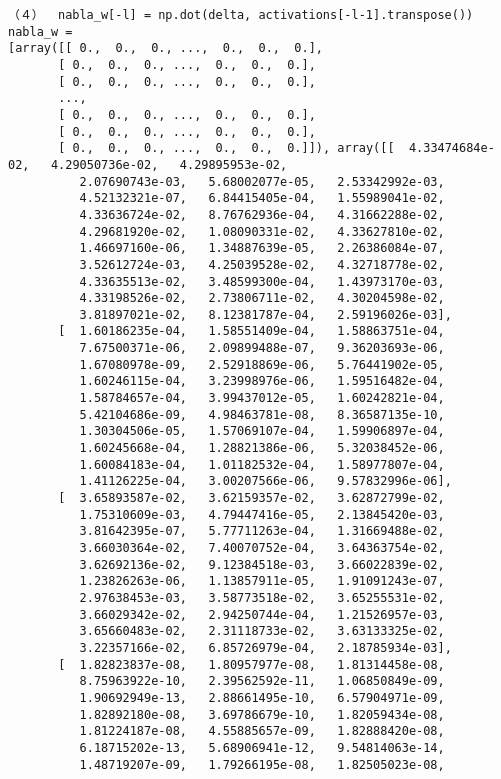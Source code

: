 \documentclass[11pt,a4j,fleqn]{jarticle}
\begin{document}
\begin{verbatim}
（４）  nabla_w[-l] = np.dot(delta, activations[-l-1].transpose())
nabla_w =
[array([[ 0.,  0.,  0., ...,  0.,  0.,  0.],
       [ 0.,  0.,  0., ...,  0.,  0.,  0.],
       [ 0.,  0.,  0., ...,  0.,  0.,  0.],
       ..., 
       [ 0.,  0.,  0., ...,  0.,  0.,  0.],
       [ 0.,  0.,  0., ...,  0.,  0.,  0.],
       [ 0.,  0.,  0., ...,  0.,  0.,  0.]]), array([[  4.33474684e-02,   4.29050736e-02,   4.29895953e-02,
          2.07690743e-03,   5.68002077e-05,   2.53342992e-03,
          4.52132321e-07,   6.84415405e-04,   1.55989041e-02,
          4.33636724e-02,   8.76762936e-04,   4.31662288e-02,
          4.29681920e-02,   1.08090331e-02,   4.33627810e-02,
          1.46697160e-06,   1.34887639e-05,   2.26386084e-07,
          3.52612724e-03,   4.25039528e-02,   4.32718778e-02,
          4.33635513e-02,   3.48599300e-04,   1.43973170e-03,
          4.33198526e-02,   2.73806711e-02,   4.30204598e-02,
          3.81897021e-02,   8.12381787e-04,   2.59196026e-03],
       [  1.60186235e-04,   1.58551409e-04,   1.58863751e-04,
          7.67500371e-06,   2.09899488e-07,   9.36203693e-06,
          1.67080978e-09,   2.52918869e-06,   5.76441902e-05,
          1.60246115e-04,   3.23998976e-06,   1.59516482e-04,
          1.58784657e-04,   3.99437012e-05,   1.60242821e-04,
          5.42104686e-09,   4.98463781e-08,   8.36587135e-10,
          1.30304506e-05,   1.57069107e-04,   1.59906897e-04,
          1.60245668e-04,   1.28821386e-06,   5.32038452e-06,
          1.60084183e-04,   1.01182532e-04,   1.58977807e-04,
          1.41126225e-04,   3.00207566e-06,   9.57832996e-06],
       [  3.65893587e-02,   3.62159357e-02,   3.62872799e-02,
          1.75310609e-03,   4.79447416e-05,   2.13845420e-03,
          3.81642395e-07,   5.77711263e-04,   1.31669488e-02,
          3.66030364e-02,   7.40070752e-04,   3.64363754e-02,
          3.62692136e-02,   9.12384518e-03,   3.66022839e-02,
          1.23826263e-06,   1.13857911e-05,   1.91091243e-07,
          2.97638453e-03,   3.58773518e-02,   3.65255531e-02,
          3.66029342e-02,   2.94250744e-04,   1.21526957e-03,
          3.65660483e-02,   2.31118733e-02,   3.63133325e-02,
          3.22357166e-02,   6.85726979e-04,   2.18785934e-03],
       [  1.82823837e-08,   1.80957977e-08,   1.81314458e-08,
          8.75963922e-10,   2.39562592e-11,   1.06850849e-09,
          1.90692949e-13,   2.88661495e-10,   6.57904971e-09,
          1.82892180e-08,   3.69786679e-10,   1.82059434e-08,
          1.81224187e-08,   4.55885657e-09,   1.82888420e-08,
          6.18715202e-13,   5.68906941e-12,   9.54814063e-14,
          1.48719207e-09,   1.79266195e-08,   1.82505023e-08,

\end{verbatim}
\end{document}
